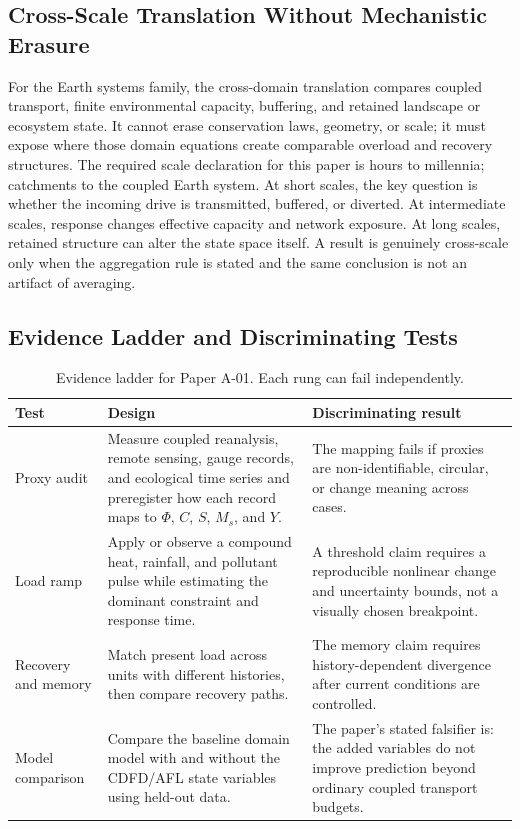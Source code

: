 \documentclass[12pt,a4paper]{article}
\begin{document}
\subsection{Cross-Scale Translation Without Mechanistic Erasure}

For the Earth systems family, the cross-domain translation compares coupled transport, finite environmental capacity, buffering, and retained landscape or ecosystem state. It cannot erase conservation laws, geometry, or scale; it must expose where those domain equations create comparable overload and recovery structures. \cite{Holling1973,Turing1952,BakTangWiesenfeld1987}
The required scale declaration for this paper is hours to millennia; catchments to the coupled Earth system. At short
scales, the key question is whether the incoming drive is transmitted,
buffered, or diverted. At intermediate scales, response changes effective
capacity and network exposure. At long scales, retained structure can alter the
state space itself. A result is genuinely cross-scale only when the aggregation
rule is stated and the same conclusion is not an artifact of averaging.

\subsection{Evidence Ladder and Discriminating Tests}

\begin{table}[htbp]
\centering
\small
\caption{Evidence ladder for Paper A-01. Each rung can fail independently.}
\begin{tabularx}{\textwidth}{|p{}|X|X|}
\hline
\textbf{Test} & \textbf{Design} & \textbf{Discriminating result} \\
\hline
Proxy audit & Measure coupled reanalysis, remote sensing, gauge records, and ecological time series and preregister how each record maps to $\Phi$, $C$, $S$, $M_s$, and $Y$. & The mapping fails if proxies are non-identifiable, circular, or change meaning across cases. \\
\hline
Load ramp & Apply or observe a compound heat, rainfall, and pollutant pulse while estimating the dominant constraint and response time. & A threshold claim requires a reproducible nonlinear change and uncertainty bounds, not a visually chosen breakpoint. \\
\hline
Recovery and memory & Match present load across units with different histories, then compare recovery paths. & The memory claim requires history-dependent divergence after current conditions are controlled. \\
\hline
Model comparison & Compare the baseline domain model with and without the CDFD/AFL state variables using held-out data. & The paper's stated falsifier is: the added variables do not improve prediction beyond ordinary coupled transport budgets. \\
\hline
\end{tabularx}
\end{table}
\end{document}
